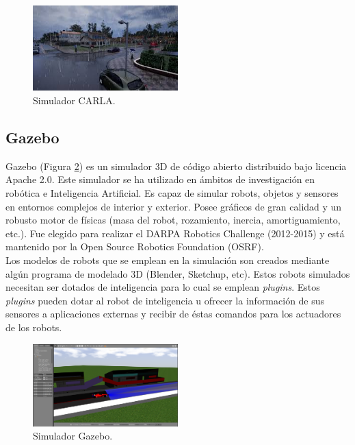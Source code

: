 \begin{figure}
\begin{center}
	\includegraphics[width=0.5\textwidth]{figures/Estado_arte/carla.jpeg}
   \caption{Simulador CARLA.}
	\label{fig.carla}
\end{center}
\end{figure}


\subsection{Gazebo}

Gazebo \cite{gazebo1} (Figura \ref{fig.gazebo}) es un simulador 3D de código abierto distribuido bajo licencia Apache 2.0. Este simulador se ha utilizado en ámbitos de investigación en robótica e Inteligencia Artificial. Es capaz de simular robots, objetos y sensores en entornos complejos de interior y exterior. Posee gráficos de gran calidad y un robusto motor de físicas (masa del robot, rozamiento, inercia, amortiguamiento, etc.). Fue elegido para realizar el DARPA Robotics Challenge (2012-2015) y está mantenido por la Open Source Robotics Foundation (OSRF).\\

Los modelos de robots que se emplean en la simulación son creados mediante algún programa de modelado 3D (Blender, Sketchup, etc). Estos robots simulados necesitan ser dotados de inteligencia para lo cual se emplean \textit{plugins}. Estos \textit{plugins} pueden dotar al robot de inteligencia u ofrecer la información de sus sensores a aplicaciones externas y recibir de éstas comandos para los actuadores de los robots.

\begin{figure}
\begin{center}
	\includegraphics[width=0.5\textwidth]{figures/Estado_arte/gazebo.png}
   \caption{Simulador Gazebo.}
	\label{fig.gazebo}
\end{center}
\end{figure}



